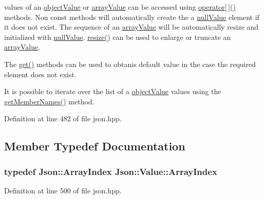 values of an \hyperlink{namespace_json_a7d654b75c16a57007925868e38212b4eae8386dcfc36d1ae897745f7b4f77a1f6}{object\-Value} or \hyperlink{namespace_json_a7d654b75c16a57007925868e38212b4eadc8f264f36b55b063c78126b335415f4}{array\-Value} can be accessed using \hyperlink{class_json_1_1_value_a7d99f5dba388cdaa152ce6ef933d64ef}{operator\mbox{[}$\,$\mbox{]}()} methods. Non const methods will automatically create the a \hyperlink{namespace_json_a7d654b75c16a57007925868e38212b4ea7d9899633b4409bd3fc107e6737f8391}{null\-Value} element if it does not exist. The sequence of an \hyperlink{namespace_json_a7d654b75c16a57007925868e38212b4eadc8f264f36b55b063c78126b335415f4}{array\-Value} will be automatically resize and initialized with \hyperlink{namespace_json_a7d654b75c16a57007925868e38212b4ea7d9899633b4409bd3fc107e6737f8391}{null\-Value}. \hyperlink{class_json_1_1_value_aa284353271ada427dbfa04a42f2be407}{resize()} can be used to enlarge or truncate an \hyperlink{namespace_json_a7d654b75c16a57007925868e38212b4eadc8f264f36b55b063c78126b335415f4}{array\-Value}.

The \hyperlink{class_json_1_1_value_a28282c9b76fa031eba7a1843c47c16fe}{get()} methods can be used to obtanis default value in the case the required element does not exist.

It is possible to iterate over the list of a \hyperlink{namespace_json_a7d654b75c16a57007925868e38212b4eae8386dcfc36d1ae897745f7b4f77a1f6}{object\-Value} values using the \hyperlink{class_json_1_1_value_a30fa08af88f2d0a038b22ba9f4e88b2a}{get\-Member\-Names()} method. 

Definition at line 482 of file json.\-hpp.



\subsection{Member Typedef Documentation}
\hypertarget{class_json_1_1_value_a184a91566cccca7b819240f0d5561c7d}{
\subsubsection[{Array\-Index}]{\setlength{\rightskip}{0pt plus 5cm}typedef {\bf Json\-::\-Array\-Index} {\bf Json\-::\-Value\-::\-Array\-Index}}}\label{class_json_1_1_value_a184a91566cccca7b819240f0d5561c7d}


Definition at line 500 of file json.\-hpp.


